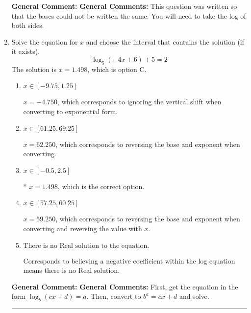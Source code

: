 \documentclass{extbook}[14pt]
\newcommand{\litem}[1]{\item #1

\rule{\textwidth}{0.4pt}}
\begin{document}
\begin{enumerate}
{\textbf{General Comment:} \textbf{General Comments:} This question was written so that the bases could not be written the same. You will need to take the log of both sides.
}
\litem{
Solve the equation for $x$ and choose the interval that contains the solution (if it exists).
\[ \log_{5}{(-4x+6)}+5 = 2 \]
The solution is \( x = 1.498 \), which is option C.\begin{enumerate}[label=\Alph*.]
\item \( x \in [-9.75, 1.25] \)

$x = -4.750$, which corresponds to ignoring the vertical shift when converting to exponential form.
\item \( x \in [61.25, 69.25] \)

$x = 62.250$, which corresponds to reversing the base and exponent when converting.
\item \( x \in [-0.5, 2.5] \)

* $x = 1.498$, which is the correct option.
\item \( x \in [57.25, 60.25] \)

$x = 59.250$, which corresponds to reversing the base and exponent when converting and reversing the value with $x$.
\item \( \text{There is no Real solution to the equation.} \)

Corresponds to believing a negative coefficient within the log equation means there is no Real solution.
\end{enumerate}

\textbf{General Comment:} \textbf{General Comments:} First, get the equation in the form $\log_b{(cx+d)} = a$. Then, convert to $b^a = cx+d$ and solve.
}
\end{enumerate}
\end{document}
